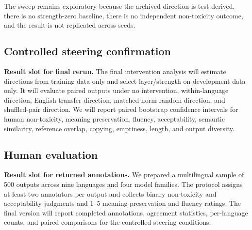 The sweep remains exploratory because the archived direction is test-derived, there is
no strength-zero baseline, there is no independent non-toxicity outcome, and the result
is not replicated across seeds.

\subsection{Controlled steering confirmation}

\textbf{Result slot for final rerun.}
The final intervention analysis will estimate directions from training data only and
select layer/strength on development data only. It will evaluate paired outputs under
no intervention, within-language direction, English-transfer direction, matched-norm
random direction, and shuffled-pair direction. We will report paired bootstrap
confidence intervals for human non-toxicity, meaning preservation, fluency,
acceptability, semantic similarity, reference overlap, copying, emptiness, length,
and output diversity.

\subsection{Human evaluation}

\textbf{Result slot for returned annotations.}
We prepared a multilingual sample of 500 outputs across nine languages and four model
families. The protocol assigns at least two annotators per output and collects binary
non-toxicity and acceptability judgments and 1--5 meaning-preservation and fluency
ratings. The final version will report completed annotations, agreement statistics,
per-language counts, and paired comparisons for the controlled steering conditions.
